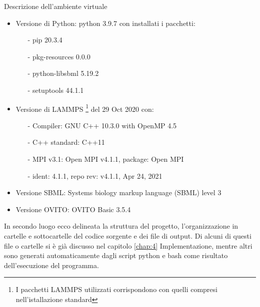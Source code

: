 \documentclass[Lau, oneside]{sapthesis}
\begin{document}
\noindent Descrizione dell'ambiente virtuale
\begin{itemize}
    \item Versione di Python: python 3.9.7 con installati i pacchetti:
    \begin{itemize}
        \item[-]  pip               \hspace*{54pt}  20.3.4
        \item[-]  pkg-resources     \hspace*{6pt}   0.0.0
        \item[-]  python-libsbml    \hspace*{0.5pt} 5.19.2
        \item[-]  setuptools        \hspace*{24pt}  44.1.1
    \end{itemize}
    \item Versione di LAMMPS \footnote{I pacchetti LAMMPS utilizzati corrispondono con quelli compresi nell'istallazione standard } del 29 Oct 2020 con:
       \begin{itemize}
        \item[-]  Compiler: GNU C++ 10.3.0 with OpenMP 4.5
        \item[-]  C++ standard: C++11
        \item[-]  MPI v3.1: Open MPI v4.1.1, package: Open MPI
        \item[-]  ident: 4.1.1, repo rev: v4.1.1, Apr 24, 2021
    \end{itemize}
    \item Versione SBML: Systems biology markup language (SBML) level 3
    \item Versione OVITO: OVITO Basic 3.5.4
\end{itemize}

In secondo luogo ecco delineata la struttura del progetto, l'organizzazione in cartelle e sottocartelle del codice sorgente e dei file di output. Di alcuni di questi file o cartelle si \`e già discusso nel capitolo \ref{chap:4} Implementazione, mentre altri sono generati automaticamente dagli script python e bash come risultato dell'esecuzione del programma. \\
\end{document}
